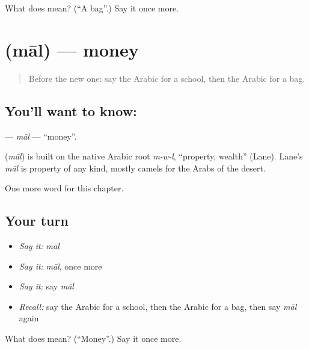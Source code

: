 \begin{tcolorbox}[breakable,colback=teal!4,colframe=teal!35!black,title={Before you move on}]
What does  mean? (\textquotedblleft{}A bag\textquotedblright{}.) Say it once more.
\end{tcolorbox}
\section[\texorpdfstring{\ar{مال} (māl)}{مال (māl)}]{ (māl) — money}

\label{lesson:AR-C74-mal}



\begin{quote}
Before the new one: say the Arabic for a school, then the Arabic for a bag.
\end{quote}

\subsection*{You'll want to know: }
\textbf{} — \emph{māl} — \textquotedblleft{}money\textquotedblright{}.

\begin{cousinweb}
\textbf{} (\emph{māl}) is built on the native Arabic root \emph{m-w-l}, \textquotedblleft{}property, wealth\textquotedblright{} (Lane). Lane's \emph{māl} is property of any kind, mostly camels for the Arabs of the desert.
\end{cousinweb}

\begin{grammarlens}[title={What you've built}]
One more word for this chapter.
\end{grammarlens}

\subsection*{Your turn}
\begin{itemize}
\raggedright
  \item \emph{Say it:} \emph{māl}
  \item \emph{Say it:} \emph{māl}, once more
  \item \emph{Say it:} say \emph{māl}
  \item \emph{Recall:} say the Arabic for a school, then the Arabic for a bag, then say \emph{māl} again
\end{itemize}

\begin{tcolorbox}[breakable,colback=teal!4,colframe=teal!35!black,title={Before you move on}]
What does  mean? (\textquotedblleft{}Money\textquotedblright{}.) Say it once more.
\end{tcolorbox}
